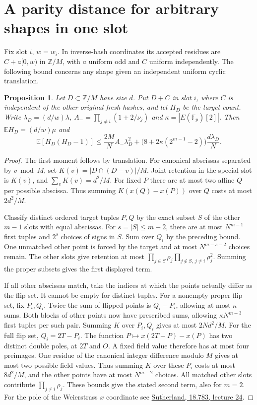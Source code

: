 \documentclass[11pt]{article}
\newtheorem{proposition}{Proposition}
\newcommand{\E}{\mathbb E}
\begin{document}
\section{A parity distance for arbitrary shapes in one slot}
Fix slot $i$, $w=w_i$. In inverse-hash coordinates its accepted
residues are $C+a[0,w)$ in $\mathbb Z/M$, with $a$ uniform odd and
$C$ uniform independently. The following bound concerns any shape
given an independent uniform cyclic translation.

\begin{proposition}
Let $D\subset\mathbb Z/M$ have size $d$. Put $D+C$ in slot $i$,
where $C$ is independent of the other original fresh hashes, and let
$H_D$ be the target count. Write $\lambda_D=(d/w)\lambda$,
$A_-=\prod_{j\ne i}(1+2/\nu_j)$ and $\kappa=|E(\mathbb F_p)[2]|$.
Then $\E H_D=(d/w)\mu$ and
\[
 \E[H_D(H_D-1)]\le
 \frac{2M}{N}A_-\lambda_D^2+
 \bigl(8+2\kappa(2^{m-1}-2)\bigr)\frac{d\lambda_D}{N}.
\]
\end{proposition}
\begin{proof}
The first moment follows by translation. For canonical abscissas
separated by $v\bmod M$, set $K(v)=|D\cap(D-v)|/M$.
Joint retention in the special slot is $K(v)$, and $\sum_vK(v)=d^2/M$.
For fixed $P$ there are at most two affine $Q$ per possible abscissa.
Thus summing $K(x(Q)-x(P))$ over $Q$ costs at most $2d^2/M$.

Classify distinct ordered target tuples $P,Q$ by the exact subset $S$
of the other $m-1$ slots with equal abscissas. For $s=|S|\le m-2$,
there are at most $N^{m-1}$ first tuples and $2^s$ choices of signs
in $S$. Sum over $Q_i$ by the preceding bound. One unmatched other
point is forced by the target and at most $N^{m-s-2}$ choices remain.
The other slots give retention at most
$\prod_{j\in S}\rho_j\prod_{j\notin S,\ j\ne i}\rho_j^2$.
Summing the proper subsets gives the first displayed term.

If all other abscissas match, take the indices at which the points
actually differ as the flip set. It cannot be empty for distinct tuples.
For a nonempty proper flip set, fix $P_i,Q_i$. Twice the sum of flipped
points is $Q_i-P_i$, allowing at most $\kappa$ sums. Both blocks of
other points now have prescribed sums, allowing $\kappa N^{m-3}$
first tuples per such pair. Summing $K$ over $P_i,Q_i$ gives at most
$2Nd^2/M$. For the full flip set, $Q_i=2T-P_i$. The function
$P\mapsto x(2T-P)-x(P)$ has two distinct double poles, at $2T$ and
$O$. A fixed field value therefore has at most four preimages.
One residue of the canonical integer difference modulo $M$ gives
at most two possible field values. Thus summing $K$ over these $P_i$
costs at most $8d^2/M$, and the other points have at most $N^{m-2}$
choices. All matched other slots contribute $\prod_{j\ne i}\rho_j$.
These bounds give the stated second term, also for $m=2$.
For the pole of the Weierstrass $x$ coordinate see
\href{https://math.mit.edu/classes/18.783/2019/LectureNotes24.pdf}
{Sutherland, 18.783, lecture 24}.
\end{proof}
\end{document}
